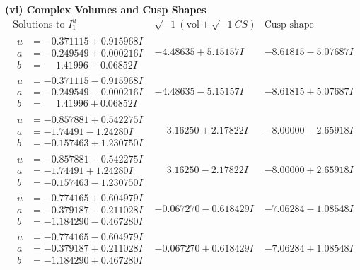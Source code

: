 \documentclass[1p]{elsarticle_modified}
\theoremstyle{definition}
\newcommand{\I}{\sqrt{-1}}
\begin{document}
\newpage\flushleft \textbf{(vi) Complex Volumes and Cusp Shapes}
$$\begin{array}{c|c|c}  
\text{Solutions to }I^u_{1}& \I (\text{vol} + \sqrt{-1}CS) & \text{Cusp shape}\\
 \hline 
\begin{aligned}
u &= -0.371115 + 0.915968 I \\
a &= -0.249549 + 0.000216 I \\
b &= \phantom{-}1.41996 - 0.06852 I\end{aligned}
 & -4.48635 + 5.15157 I & -8.61815 - 5.07687 I \\ \hline\begin{aligned}
u &= -0.371115 - 0.915968 I \\
a &= -0.249549 - 0.000216 I \\
b &= \phantom{-}1.41996 + 0.06852 I\end{aligned}
 & -4.48635 - 5.15157 I & -8.61815 + 5.07687 I \\ \hline\begin{aligned}
u &= -0.857881 + 0.542275 I \\
a &= -1.74491 - 1.24280 I \\
b &= -0.157463 + 1.230750 I\end{aligned}
 & \phantom{-}3.16250 + 2.17822 I & -8.00000 - 2.65918 I \\ \hline\begin{aligned}
u &= -0.857881 - 0.542275 I \\
a &= -1.74491 + 1.24280 I \\
b &= -0.157463 - 1.230750 I\end{aligned}
 & \phantom{-}3.16250 - 2.17822 I & -8.00000 + 2.65918 I \\ \hline\begin{aligned}
u &= -0.774165 + 0.604979 I \\
a &= -0.379187 - 0.211028 I \\
b &= -1.184290 - 0.467280 I\end{aligned}
 & -0.067270 - 0.618429 I & -7.06284 - 1.08548 I \\ \hline\begin{aligned}
u &= -0.774165 - 0.604979 I \\
a &= -0.379187 + 0.211028 I \\
b &= -1.184290 + 0.467280 I\end{aligned}
 & -0.067270 + 0.618429 I & -7.06284 + 1.08548 I \\ \hline\begin{aligned}

\end{aligned}
\end{array}$$
\end{document}
